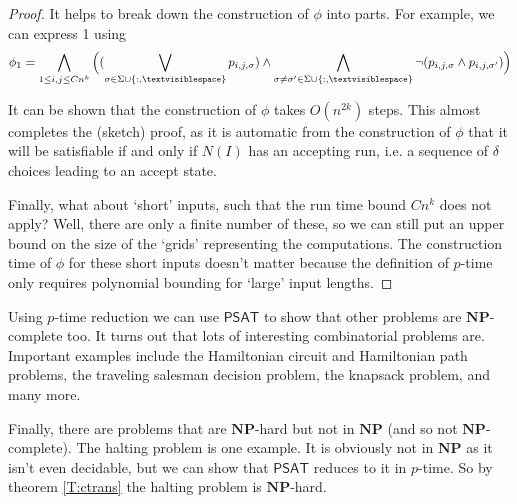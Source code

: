 \documentclass{article}
\theoremstyle{plain}
\theoremstyle{definition}
\newcommand{\tvs}{\textvisiblespace}
\newcommand{\NP}{\mathbf{NP}}
\newcommand{\SAT}{\mathsf{PSAT}}
\begin{document}
\begin{proof}
It helps to break down the construction of $\phi$ into parts. For example, we can express 1 using
\[\phi_1=\bigwedge_{1\leq i,j\leq Cn^k}\Big((\bigvee_{\sigma\in\Sigma\cup\{:,\tvs\}}p_{i,j,\sigma})\wedge \bigwedge_{\sigma\neq\sigma'\in\Sigma\cup\{:,\tvs\}}\neg (p_{i,j,\sigma}\wedge p_{i,j,\sigma'})\Big)\]

It can be shown that the construction of $\phi$ takes $O(n^{2k})$ steps. This almost completes the (sketch) proof, as it is automatic from the construction of $\phi$ that it will be satisfiable if and only if $N(I)$ has an accepting run, i.e. a sequence of $\delta$ choices leading to an accept state. 

Finally, what about `short' inputs, such that the run time bound $Cn^k$ does not apply? Well, there are only a finite number of these, so we can still put an upper bound on the size of the `grids' representing the computations. The construction time of $\phi$ for these short inputs doesn't matter because the definition of $p$-time only requires polynomial bounding for `large' input lengths.       
\end{proof}

Using $p$-time reduction we can use $\SAT$ to show that other problems are $\NP$-complete too. It turns out that lots of interesting combinatorial problems are. Important examples include the Hamiltonian circuit and Hamiltonian path problems, the traveling salesman decision problem, the knapsack problem, and many more.

Finally, there are problems that are $\NP$-hard but not in $\NP$ (and so not $\NP$-complete). The halting problem is one example. It is obviously not in $\NP$ as it isn't even decidable, but we can show that $\SAT$ reduces to it in $p$-time. So by theorem \ref{T:ctrans} the halting problem is $\NP$-hard. 
\end{document}
